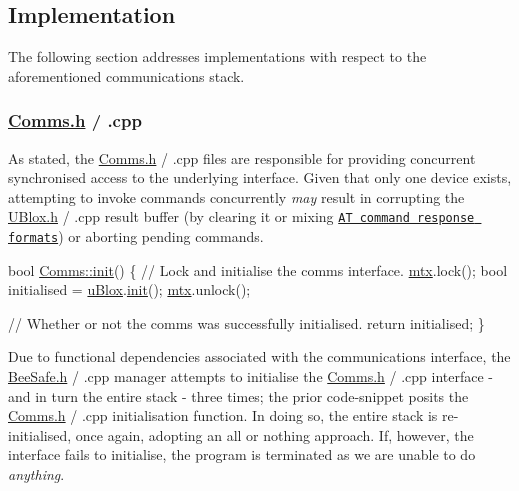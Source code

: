 \subsection*{Implementation}

The following section addresses implementations with respect to the aforementioned communications stack. \subsubsection*{\hyperlink{_comms_8h}{Comms.\+h} / .cpp}

As stated, the \hyperlink{_comms_8h}{Comms.\+h} / .cpp files are responsible for providing concurrent synchronised access to the underlying interface. Given that only one device exists, attempting to invoke commands concurrently {\itshape may} result in corrupting the \hyperlink{_u_blox_8h}{U\+Blox.\+h} / .cpp result buffer (by clearing it or mixing \href{https://github.com/itsBelinda/ENG5220-2020-Team13/wiki/uBlox-and-CellLocate}{\tt AT command response formats}) or aborting pending commands.


\begin{DoxyCode}
\textcolor{keywordtype}{bool} \hyperlink{class_comms_aa0519d3ed2d5bd6aad60101080ac2de7}{Comms::init}()
\{
    \textcolor{comment}{// Lock and initialise the comms interface.}
    \hyperlink{class_comms_a21df861b1202573e4cd0cb5666d638fe}{mtx}.lock();
    \textcolor{keywordtype}{bool} initialised = \hyperlink{class_comms_ac64dea134b116147e5441172346dbd6c}{uBlox}.\hyperlink{class_u_blox_a34c2f507ff3bbd21b9aea788a015527a}{init}();
    \hyperlink{class_comms_a21df861b1202573e4cd0cb5666d638fe}{mtx}.unlock();

    \textcolor{comment}{// Whether or not the comms was successfully initialised.}
    \textcolor{keywordflow}{return} initialised;
\}
\end{DoxyCode}
 Due to functional dependencies associated with the communications interface, the \hyperlink{_bee_safe_8h}{Bee\+Safe.\+h} / .cpp manager attempts to initialise the \hyperlink{_comms_8h}{Comms.\+h} / .cpp interface -\/ and in turn the entire stack -\/ three times; the prior code-\/snippet posits the \hyperlink{_comms_8h}{Comms.\+h} / .cpp initialisation function. In doing so, the entire stack is re-\/initialised, once again, adopting an all or nothing approach. If, however, the interface fails to initialise, the program is terminated as we are unable to do {\itshape anything}.


